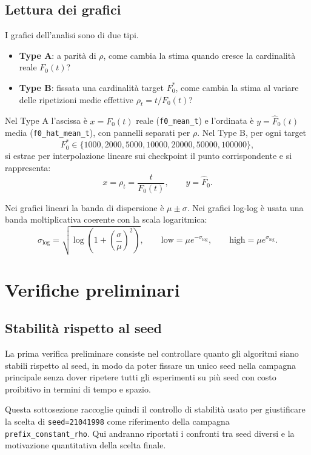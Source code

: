 \subsection{Lettura dei grafici}

I grafici dell'analisi sono di due tipi.
\begin{itemize}
    \item \textbf{Type A}: a parità di \(\rho\), come cambia la stima quando
    cresce la cardinalità reale \(F_0(t)\)?
    \item \textbf{Type B}: fissata una cardinalità target \(F_0^{\ast}\), come cambia
    la stima al variare delle ripetizioni medie effettive
    \(\rho_t=t/F_0(t)\)?
\end{itemize}

Nel Type A l'ascissa è \(x=F_0(t)\) reale (\texttt{f0\_mean\_t}) e l'ordinata
è \(y=\hat{F}_0(t)\) media (\texttt{f0\_hat\_mean\_t}), con pannelli separati
per \(\rho\). Nel Type B, per ogni target
\[
F_0^{\ast} \in \{1000,2000,5000,10000,20000,50000,100000\},
\]
si estrae per interpolazione lineare sui checkpoint il punto corrispondente e
si rappresenta:
\[
x=\rho_t=\frac{t}{F_0(t)},\qquad y=\hat{F}_0.
\]

Nei grafici lineari la banda di dispersione è \(\mu\pm \sigma\). Nei grafici
log-log è usata una banda moltiplicativa coerente con la scala logaritmica:
\[
\sigma_{\log}=\sqrt{\log\!\left(1+\left(\frac{\sigma}{\mu}\right)^2\right)},
\qquad
\text{low}=\mu e^{-\sigma_{\log}},
\qquad
\text{high}=\mu e^{\sigma_{\log}}.
\]

\section{Verifiche preliminari}

\subsection{Stabilità rispetto al seed}

La prima verifica preliminare consiste nel controllare quanto gli algoritmi
siano stabili rispetto al seed, in modo da poter fissare un unico seed nella
campagna principale senza dover ripetere tutti gli esperimenti su più seed con
costo proibitivo in termini di tempo e spazio.

Questa sottosezione raccoglie quindi il controllo di stabilità usato per
giustificare la scelta di \texttt{seed=21041998} come riferimento della
campagna \texttt{prefix\_constant\_rho}. Qui andranno riportati i confronti tra
seed diversi e la motivazione quantitativa della scelta finale.

